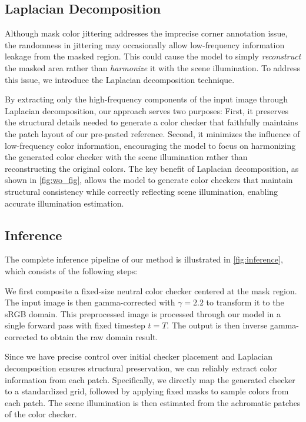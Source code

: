 {\subsection{Laplacian Decomposition}
\label{sec:laplacian_composition}
Although mask color jittering addresses the imprecise corner annotation issue, the randomness in jittering may occasionally allow low-frequency information leakage from the masked region. This could cause the model to simply \textit{reconstruct} the masked area rather than \textit{harmonize} it with the scene illumination. To address this issue, we introduce the Laplacian decomposition technique.

By extracting only the high-frequency components of the input image through Laplacian decomposition, our approach serves two purposes: First, it preserves the structural details needed to generate a color checker that faithfully maintains the patch layout of our pre-pasted reference. Second, it minimizes the influence of low-frequency color information, encouraging the model to focus on harmonizing the generated color checker with the scene illumination rather than reconstructing the original colors.
% 
The key benefit of Laplacian decomposition, as shown in \cref{fig:wo_fig}, allows the model to generate color checkers that maintain structural consistency while correctly reflecting scene illumination, enabling accurate illumination estimation.

\subsection{Inference}
\label{sec:inference}
The complete inference pipeline of our method is illustrated in \cref{fig:inference}, which consists of the following steps:

\vspace{3pt}  
We first composite a fixed-size neutral color checker centered at the mask region. The input image is then gamma-corrected with $\gamma = 2.2$ to transform it to the sRGB domain. This preprocessed image is processed through our model in a single forward pass with fixed timestep $t = T$. The output is then inverse gamma-corrected to obtain the raw domain result.

\vspace{3pt}  Since we have precise control over initial checker placement and Laplacian decomposition ensures structural preservation, we can reliably extract color information from each patch. Specifically, we directly map the generated checker to a standardized grid, followed by applying fixed masks to sample colors from each patch. The scene illumination is then estimated from the achromatic patches of the color checker.

}
